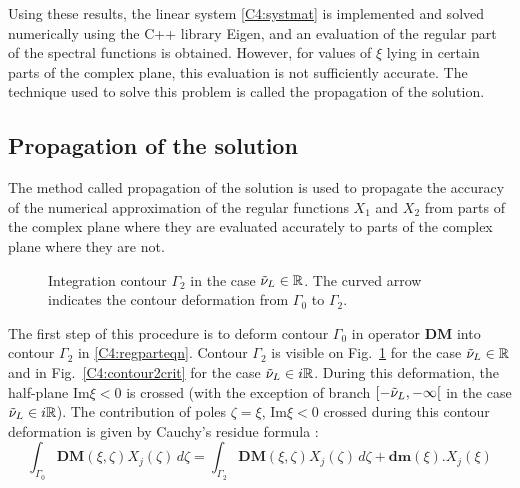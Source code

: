  Using these results, the linear system \eqref{C4:systmat} is implemented and solved numerically using the C++ library Eigen, and an evaluation of the regular part of the spectral functions is obtained. However, for values of $\xi$ lying in certain parts of the complex plane, this evaluation is not sufficiently accurate. The technique used to solve this problem is called the propagation of the solution.
 
\subsection{Propagation of the solution}
\label{C4:propag}
The method called propagation of the solution is used to propagate the accuracy of the numerical approximation of the regular functions $X_1$ and $X_2$ from parts of the complex plane where they are evaluated accurately to parts of the complex plane where they are not.

\begin{figure}[h]
	\centering
	\caption{Integration contour $\Gamma_2$ in the case $\tilde{\nu}_L \in \mathbb{R}$. The curved arrow indicates the contour deformation from $\Gamma_0$ to $\Gamma_2$.}
	\label{C4:contour2}
\end{figure}

The first step of this procedure is to deform contour $\Gamma_0$ in operator $\mathbf{DM}$ into contour $\Gamma_2$ in \eqref{C4:regparteqn}. Contour $\Gamma_2$ is visible on Fig.~\ref{C4:contour2} for the case $\tilde{\nu}_L \in \mathbb{R}$ and in Fig.~\ref{C4:contour2crit} for the case $\tilde{\nu}_L \in i\mathbb{R}$. During this deformation, the half-plane Im$\xi<0$ is crossed (with the exception of branch $\lbrack -\tilde{\nu}_L,-\infty \lbrack$ in the case $\tilde{\nu}_L \in i\mathbb{R}$). The contribution of poles $\zeta=\xi$, Im$\xi<0$ crossed during this contour deformation is given by Cauchy's residue formula :
\begin{equation}
\int_{\Gamma_0} \textbf{DM}(\xi,\zeta)X_j(\zeta)\, d\zeta = \int_{\Gamma_2}  \textbf{DM}(\xi,\zeta)X_j(\zeta)\, d\zeta + \textbf{dm}(\xi).X_j(\xi)
\label{C4:DM2}
\end{equation}


